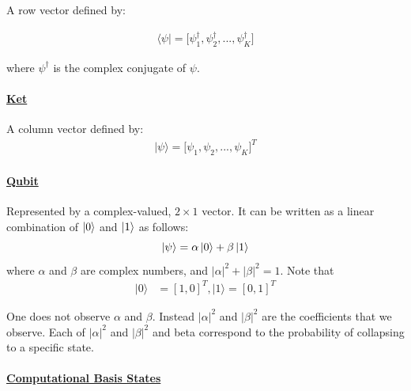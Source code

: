 \documentclass[
]{article}
\begin{document}
A row vector defined by:

\begin{align}
   \langle  \psi \vert = \big [ \psi^\dagger_{1}, \psi^\dagger_{2}, ... , \psi^\dagger_{K} \big]
\end{align}

where \(\psi^\dagger\) is the complex conjugate of \(\psi\).

\paragraph*{\texorpdfstring{\underline{Ket}}{}}\label{section-11}

A column vector defined by: \begin{align*}
    \vert \psi \rangle  = \big [ \psi_{1}, \psi_{2}, ... , \psi_K \big]^T
\end{align*}

\paragraph*{\texorpdfstring{\underline{Qubit}}{}}\label{section-12}

Represented by a complex-valued, \(2 \times 1\) vector. It can be
written as a linear combination of \(\ket{0}\) and \(\ket{1}\) as
follows: \[
\ket{\psi} = \alpha\ket{0} + \beta\ket{1}
\] where \(\alpha\) and \(\beta\) are complex numbers, and
\(|\alpha|^2 + |\beta|^2 = 1\). Note that \begin{align}
    \vert 0 \rangle  &=  [1 , 0]^T ,  \vert 1 \rangle = [0, 1]^T 
\end{align}

One does not observe \(\alpha\) and \(\beta\). Instead \(|\alpha|^2\)
and \(|\beta|^2\) are the coefficients that we observe. Each of
\(|\alpha|^2\) and \(|\beta|^2\) and beta correspond to the probability
of collapsing to a specific state.

\paragraph*{\texorpdfstring{\underline{Computational Basis States}}{}}\label{section-13}
\end{document}
